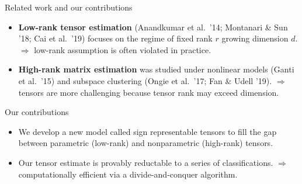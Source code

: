 \documentclass[10pt, mathserif]{beamer} %
\theoremstyle{definition}
\theoremstyle{plain}
\begin{document}
\begin{frame}{Related work and our contributions}


\begin{itemize}
\item {\bf Low-rank tensor estimation} (Anandkumar et al.\ '14; Montanari \& Sun '18; Cai et al.\ '19) focuses on the regime of fixed rank $r$ growing dimension $d$. $\Rightarrow$ {\color{red}low-rank assumption is often violated} in practice. 
\item {\bf High-rank matrix estimation} was studied under nonlinear models (Ganti et al.\ '15) and subspace clustering (Ongie et al.\ '17; Fan \& Udell '19). $\Rightarrow$ tensors are more challenging because {\color{red}tensor rank may exceed dimension}. 
\end{itemize}

\pause
\begin{block}{Our contributions}
\begin{itemize}
\item We develop a new model called {\color{red} sign representable tensors} to fill the gap between parametric (low-rank) and nonparametric (high-rank) tensors. 
\item Our tensor estimate is {\color{red}provably reductable} to a series of classifications. $\Rightarrow$ computationally efficient via a divide-and-conquer algorithm. 
\end{itemize}
\end{block}
\end{frame}
\end{document}
